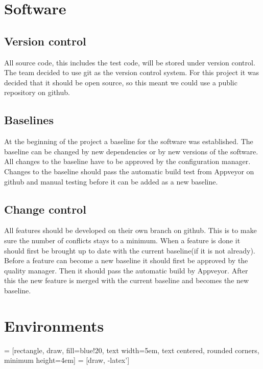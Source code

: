 \documentclass[12pt]{article}
\begin{document}
	\section{Software}

	\subsection{Version control}

	All source code, this includes the test code, will be stored under version control. The team decided to use \gls{git} as the version control system. For this project it was decided that it should be open source, so this meant we could use a public repository on \gls{github}.

	\subsection{Baselines}

	At the beginning of the project a baseline for the software was established. The baseline can be changed by new dependencies or by new versions of the software. All changes to the baseline have to be approved by the configuration manager. \\
	Changes to the baseline should pass the automatic build test from \gls{Appveyor} on \gls{github} and manual testing before it can be added as a new baseline.

	\subsection{Change control}

	All features should be developed on their own branch on \gls{github}. This is to make sure the number of conflicts stays to a minimum. When a feature is done it should first be brought up to date with the current baseline(if it is not already). Before a feature can become a new baseline it should first be approved by the quality manager. Then it should pass the automatic build by \gls{Appveyor}. After this the new feature is merged with the current baseline and becomes the new baseline.

	\clearpage
	\section{Environments}

	 = [rectangle, draw, fill=blue!20,
	text width=5em, text centered, rounded corners, minimum height=4em]
	 = [draw, -latex']
\end{document}
